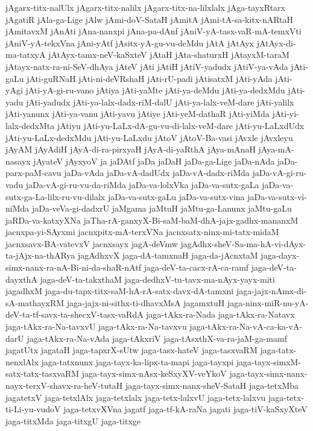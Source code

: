 {jAgarx-titx-nalUlx
jAgarx-titx-nalilx
jAgarx-titx-na-lilxlalx
jAga-tayxRtarx
jAgatiR
jAla-ga-Lige
jAlw
jAmi-doV-SataH
jAmitA
jAmi-tA-sa-kitx-nARtaH
jAmitavxM
jAnAti
jAna-nanxpi
jAna-pa-dAnf
jAniV-yA-tasx-vaR-mA-temxVti
jAniV-yA-tekxVna
jAni-yAtf
jAsitx-yA-gu-vu-deMdu
jAtA
jAtAyx
jAtAyx-di-ma-tatxyA
jAtAyx-tamx-neV-kaSxteV
jAtaH
jAta-shaturxH
jAtayxM-taraM
jAtayx-natx-ra-ni-SeV-dhAya
jAteV
jAti
jAtiH
jAtiV-yadudx
jAtiV-ya-vAda
jAti-gaLu
jAti-guRNaH
jAti-ni-deVRshaH
jAti-rU-padi
jAtisatxM
jAti-yAda
jAti-yAgi
jAti-yA-gi-ru-vano
jAtiya
jAti-yaMte
jAti-ya-deMdu
jAti-ya-dedxMdu
jAti-yadu
jAti-yadudx
jAti-ya-lalx-dadx-riM-dalU
jAti-ya-lalx-veM-dare
jAti-yalilx
jAti-yanunx
jAti-ya-vanu
jAti-yavu
jAtiye
jAti-yeM-dathaR
jAti-yiMda
jAti-yi-lalx-dedxMta
jAtiyu
jAti-yu-LaLx-dA-gu-vu-di-lalx-veM-dare
jAti-yu-LaLxdUdx
jAti-yu-LaLx-dedxMdu
jAti-yu-LaLxdu
jAtoV
jAtoV-Ba-vasi
jAvxle
jAvxleyu
jAyAM
jAyAdiH
jAyA-di-ra-pirxyaH
jAyA-di-yaRthA
jAya-mAnaH
jAya-mA-nasayx
jAyateV
jAyxyoV
ja
jaDAtf
jaDa
jaDaH
jaDa-ga-Lige
jaDa-nAda
jaDa-parx-paM-cavu
jaDa-vAda
jaDa-vA-dadUdx
jaDa-vA-dadx-riMda
jaDa-vA-gi-ru-vadu
jaDa-vA-gi-ru-vu-da-riMda
jaDa-va-lolxVka
jaDa-va-sutx-gaLa
jaDa-va-sutx-ga-La-lilx-ru-vu-dilalx
jaDa-va-sutx-gaLu
jaDa-va-sutx-vina
jaDa-va-sutx-vi-niMda
jaDa-veVa-gi-dadxrU
jaMgama
jaMtuH
jaMtu-ga-Lanunx
jaMtu-gaLu
jaRDa-va-katxyXNa
jaTha-rA-ganxyX-Bi-saM-baM-dhA-jajx-gadhx-mananxM
jacnxpa-yi-SAyxmi
jacnxpitx-mA-terxVNa
jacnxsatx-ninx-mi-tatx-midaM
jacnxsavx-BA-vatevxV
jacnxsayx
jagA-deVmw
jagAdhx-sheV-Sa-ma-hA-vi-dAyx-ta-jAjx-na-thARya
jagAdhxvX
jaga-dA-tamxnaH
jaga-da-jAcnxtaM
jaga-dayx-simx-nanx-ra-nA-Bi-ni-da-shaR-nAtf
jaga-deV-ta-cacx-rA-ca-ramf
jaga-deV-ta-dayxthA
jaga-deV-ta-takxthaM
jaga-dedhxV-tu-tavx-ma-nAyx-yayx-miti
jagadhxM
jaga-du-tapx-titx-saM-hA-rA-satx-davx-dA-tamxni
jaga-jajx-nAmx-di-sA-mathayxRM
jaga-jajx-ni-sithx-ti-dhavxMsA
jagamxtuH
jaga-ninx-miR-nu-yA-deV-ta-tf-savx-ta-shecxV-tasx-vaRdA
jaga-tAkx-ra-Nada
jaga-tAkx-ra-Natavx
jaga-tAkx-ra-Na-tavxvU
jaga-tAkx-ra-Na-tavxvu
jaga-tAkx-ra-Na-vA-ca-ka-vA-darU
jaga-tAkx-ra-Na-vAda
jaga-tAkxriV
jaga-tAsxthX-va-ra-jaM-ga-mamf
jagatUtx
jagataH
jaga-tapxrX-sUtw
jaga-tasx-hateV
jaga-tasxvaRM
jaga-tatx-nenxlAlx
jaga-tatxnunx
jaga-tayx-ka-lipx-ta-mapi
jaga-tayxpi
jaga-tayx-simxM-satx-tatx-tasxvaRM
jaga-tayx-simx-nAsx-keSxyXV-veYkoV
jaga-tayx-simx-nanx-nayx-terxV-shavx-ra-heV-tutaH
jaga-tayx-simx-nanx-sheV-SataH
jaga-tetxMba
jagatetxV
jaga-tetxlAlx
jaga-tetxlalx
jaga-tetx-lalxvU
jaga-tetx-lalxvu
jaga-tetx-ti-Li-yu-vudoV
jaga-tetxvXVna
jagatf
jaga-tf-kA-raNa
jagati
jaga-tiV-kaSxyXteV
jaga-titxMda
jaga-titxgU
jaga-titxge
}

